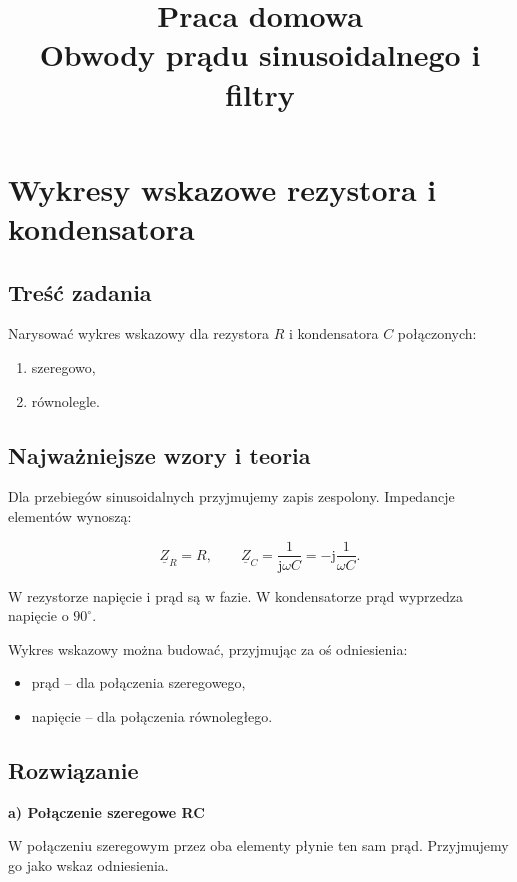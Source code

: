 \documentclass[12pt,a4paper]{article}
\title{\textbf{Praca domowa}\\Obwody prądu sinusoidalnego i filtry}
\author{}
\date{}
\newcommand{\jw}{\mathrm{j}\omega}
\newcommand{\Z}{\underline{Z}}
\begin{document}
\maketitle
\tableofcontents
\newpage

\section{Wykresy wskazowe rezystora i kondensatora}

\subsection*{Treść zadania}

Narysować wykres wskazowy dla rezystora $R$ i kondensatora $C$ połączonych:
\begin{enumerate}[label=\alph*)]
    \item szeregowo,
    \item równolegle.
\end{enumerate}

\subsection*{Najważniejsze wzory i teoria}

Dla przebiegów sinusoidalnych przyjmujemy zapis zespolony.
Impedancje elementów wynoszą:

\[
\Z_R=R,\qquad
\Z_C=\frac{1}{\jw C}
=-\mathrm{j}\frac{1}{\omega C}.
\]

W rezystorze napięcie i prąd są w fazie.
W kondensatorze prąd wyprzedza napięcie o $90^\circ$.

Wykres wskazowy można budować, przyjmując za oś odniesienia:
\begin{itemize}
    \item prąd -- dla połączenia szeregowego,
    \item napięcie -- dla połączenia równoległego.
\end{itemize}

\subsection*{Rozwiązanie}

\textbf{a) Połączenie szeregowe RC}

W połączeniu szeregowym przez oba elementy płynie ten sam prąd.
Przyjmujemy go jako wskaz odniesienia.
\end{document}
